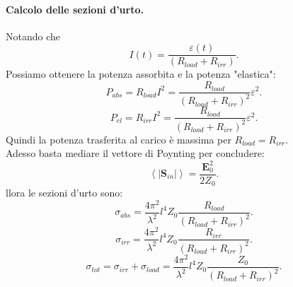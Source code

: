 \paragraph{Calcolo delle sezioni d'urto.}
Notando che 
\[
	I\left( t \right) = \frac{\varepsilon\left( t \right) }{\left( R_{load} + R_{irr} \right) }
.\] 
Possiamo ottenere la potenza assorbita e la potenza "elastica":
\[
	P_{abs} = R_{load} I^2 = \frac{R_{load}}{\left( R_{load} + R_{irr} \right) ^2}\varepsilon^2
.\] 
\[
P_{el} = R_{irr} I^2 =  \frac{R_{load}}{\left( R_{load} + R_{irr} \right) ^2}\varepsilon^2
.\] 
Quindi la potenza trasferita al carico è massima per $R_{load} = R_{irr}$.\\
Adesso basta mediare il vettore di Poynting per concludere:
\[
\left< \left| \boldsymbol{S}_{in} \right| \right> = \frac{\boldsymbol{E}_0^2}{2Z_0}
.\] 
llora le sezioni d'urto sono:
\[
	\sigma_{abs} = \frac{4\pi^2}{\lambda^2}l^4Z_0 \frac{R_{load}}{\left(R_{load} + R_{irr}\right)^2}
.\] 
\[
	\sigma_{irr} = \frac{4\pi^2}{\lambda^2}l^4Z_0 \frac{R_{irr}}{\left(R_{load} + R_{irr}\right)^2}
.\]
\[
	\sigma_{tot} = \sigma_{irr} + \sigma_{load} = \frac{4\pi^2}{\lambda^2}l^4Z_0 \frac{Z_0}{\left(R_{load} + R_{irr}\right)^2}
.\] 

